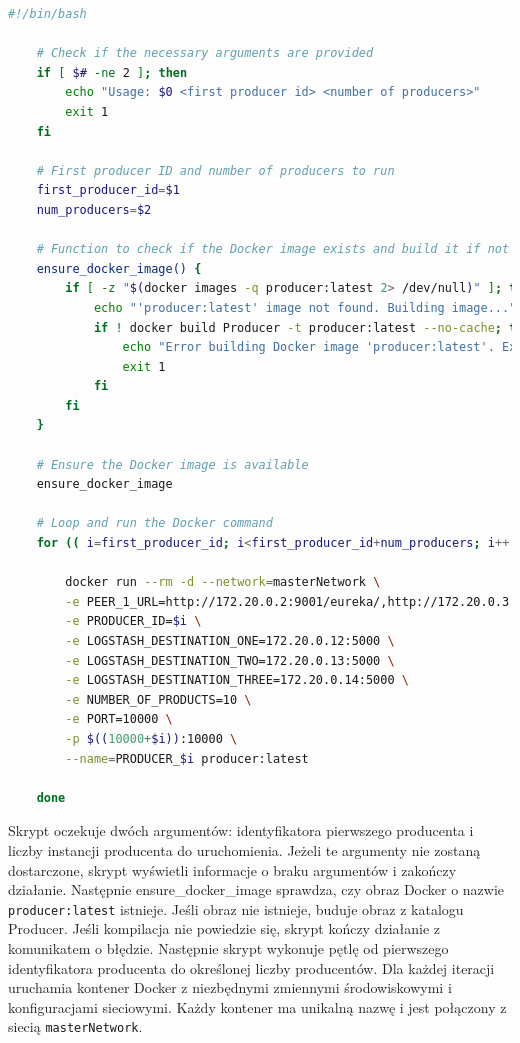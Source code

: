 \begin{lstlisting}[language=bash,caption=Kod skryptu producers.sh,label=producerBashScript]
    #!/bin/bash

    # Check if the necessary arguments are provided
    if [ $# -ne 2 ]; then
        echo "Usage: $0 <first producer id> <number of producers>"
        exit 1
    fi
    
    # First producer ID and number of producers to run
    first_producer_id=$1
    num_producers=$2
    
    # Function to check if the Docker image exists and build it if not
    ensure_docker_image() {
        if [ -z "$(docker images -q producer:latest 2> /dev/null)" ]; then
            echo "'producer:latest' image not found. Building image..."
            if ! docker build Producer -t producer:latest --no-cache; then
                echo "Error building Docker image 'producer:latest'. Exiting."
                exit 1
            fi
        fi
    }
    
    # Ensure the Docker image is available
    ensure_docker_image
    
    # Loop and run the Docker command
    for (( i=first_producer_id; i<first_producer_id+num_producers; i++ )); do
    
        docker run --rm -d --network=masterNetwork \
        -e PEER_1_URL=http://172.20.0.2:9001/eureka/,http://172.20.0.3:9002/eureka/,http://172.20.0.4:9003/eureka/ \
        -e PRODUCER_ID=$i \
        -e LOGSTASH_DESTINATION_ONE=172.20.0.12:5000 \
        -e LOGSTASH_DESTINATION_TWO=172.20.0.13:5000 \
        -e LOGSTASH_DESTINATION_THREE=172.20.0.14:5000 \
        -e NUMBER_OF_PRODUCTS=10 \
        -e PORT=10000 \
        -p $((10000+$i)):10000 \
        --name=PRODUCER_$i producer:latest
    
    done

\end{lstlisting}

Skrypt oczekuje dwóch argumentów: identyfikatora pierwszego producenta i liczby instancji producenta do uruchomienia. Jeżeli te argumenty nie zostaną dostarczone, skrypt wyświetli informacje o braku argumentów i zakończy działanie. Następnie ensure\_docker\_image sprawdza, czy obraz Docker o nazwie \verb|producer:latest| istnieje. Jeśli obraz nie istnieje, buduje obraz z katalogu Producer. Jeśli kompilacja nie powiedzie się, skrypt kończy działanie z komunikatem o błędzie. Następnie skrypt wykonuje pętlę od pierwszego identyfikatora producenta do określonej liczby producentów. Dla każdej iteracji uruchamia kontener Docker z niezbędnymi zmiennymi środowiskowymi i konfiguracjami sieciowymi. Każdy kontener ma unikalną nazwę i jest połączony z siecią \verb|masterNetwork|.

